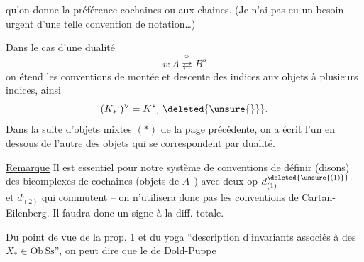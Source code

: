 qu'on donne la préférence  cochaines ou aux chaines. (Je n'ai pas eu un besoin urgent d'une telle convention de notation\ldots)

Dans le cas d'une dualité
\[
 v:A\overset{\approx}{\rightleftarrows}B^o
\]
on étend les conventions de montée et descente des indices aux objets à plusieurs indices, ainsi
\[
 (K_*{}^{.})^\vee=K^*{}_.\ \deleted{\unsure{\}}}.
\]
Dans la suite d'objets mixtes $(*)$ de la page précédente, on a écrit l'un en dessous de l'autre des objets qui se correspondent par dualité.

\uline{Remarque} Il est essentiel pour notre système de conventions de définir (disons) des bicomplexes de cochaines (objets de $A^{..}$) avec deux op  $d^{\deleted{\unsure{(1)}}\, .}_{(1)}$ et $d^{.}_{(2)}$ qui \uline{commutent} -- on n'utilisera donc pas les conventions de Cartan-Eilenberg. Il faudra donc un signe à la diff. totale.

Du point de vue de la prop. 1 et du yoga  ``description d'invariants associés à des $X_*\in\mathrm{Ob}\,\mathrm{Ss}$'', on peut dire que le  de Dold-Puppe
